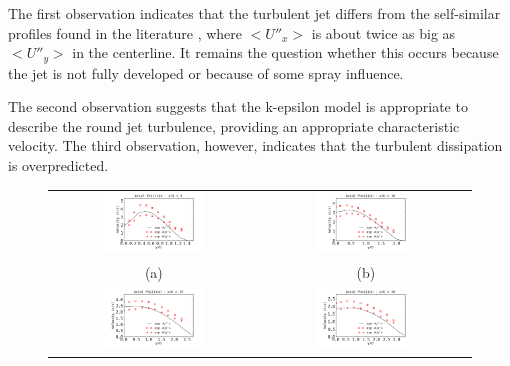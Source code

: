 The first observation indicates that the turbulent jet differs from the self-similar profiles found in the literature \cite{pope2000turbulent}, where $<U''_x>$ is about twice as big as $<U''_y>$ in the centerline. It remains the question whether this occurs because the jet is not fully developed or because of some spray influence.

The second observation suggests that the k-epsilon model is appropriate to describe the round jet turbulence, providing an appropriate characteristic velocity. The third observation, however, indicates that the turbulent dissipation is overpredicted.

\begin{figure}[!htb]
 \centering
\begin{tabular}{cc}
 \includegraphics[width=0.5\textwidth]{./figuras/chap5/UU/UUx5.png} & \includegraphics[width=0.5\textwidth]{./figuras/chap5/UU/UUx10.png} \\
(a) & (b) \\
\includegraphics[width=0.5\textwidth]{./figuras/chap5/UU/UUx15.png} & \includegraphics[width=0.5\textwidth]{./figuras/chap5/UU/UUx20.png} \\

\end{tabular}
\end{figure}
